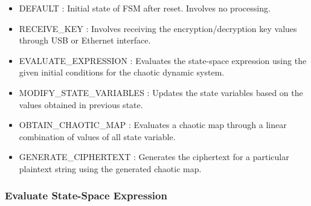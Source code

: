 \begin{itemize}
\item DEFAULT : Initial state of FSM after reset. Involves no processing.
\item RECEIVE\_KEY : Involves receiving the encryption/decryption key values through USB or Ethernet interface.
\item EVALUATE\_EXPRESSION : Evaluates the state-space expression using the given initial conditions for the chaotic dynamic system.
\item MODIFY\_STATE\_VARIABLES : Updates the state variables based on the values obtained in previous state.
\item OBTAIN\_CHAOTIC\_MAP : Evaluates a chaotic map through a linear combination of values of all state variable.
\item GENERATE\_CIPHERTEXT : Generates the ciphertext for a particular plaintext string using the generated chaotic map.
\end{itemize}

\subsubsection{Evaluate State-Space Expression}

